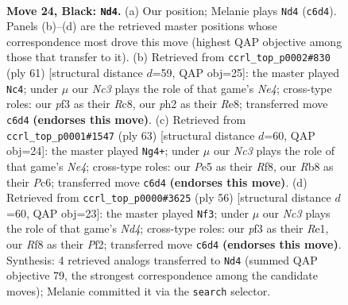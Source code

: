 \documentclass[11pt]{article}
\begin{document}
\clearpage

\begin{figure}[p]\centering
\begin{subfigure}{0.46\textwidth}\centering
\resizebox{\linewidth}{!}{%
\newchessgame
\chessboard[
  setfen={1rb2r2/p1pp1pk1/2n5/2R1p2p/8/5PP1/PP3P1P/2B1KB1R b - - 1 24},
  showmover=false,
  pgfstyle=straightmove, color=movearrow, markmove={c6-d4}
]}
\caption{}
\end{subfigure}\hfill
\begin{subfigure}{0.46\textwidth}\centering
\resizebox{\linewidth}{!}{%
\newchessgame
\chessboard[
  setfen={2r1r1k1/5pp1/p5p1/Pp1Rn1B1/1b5P/1N4P1/1P2PP2/1R4K1 b - - 0 31},
  showmover=false,
  pgfstyle=straightmove, color=movearrow, markmove={e5-c4}
]}
\caption{}
\end{subfigure}
\\[4pt]
\begin{subfigure}{0.46\textwidth}\centering
\resizebox{\linewidth}{!}{%
\newchessgame
\chessboard[
  setfen={5r2/1p2k3/2ppr3/p3np1p/2P2P1P/6P1/PP1RBK2/4R3 b - - 0 32},
  showmover=false,
  pgfstyle=straightmove, color=movearrow, markmove={e5-g4}
]}
\caption{}
\end{subfigure}\hfill
\begin{subfigure}{0.46\textwidth}\centering
\resizebox{\linewidth}{!}{%
\newchessgame
\chessboard[
  setfen={4r1k1/pp1b1n1p/4p1p1/3pb3/3N3P/1P1R4/P2B1PP1/4R1K1 w - - 1 29},
  showmover=false,
  pgfstyle=straightmove, color=movearrow, markmove={d4-f3}
]}
\caption{}
\end{subfigure}
\caption{\textbf{Move 24, Black: \texttt{Nd4}.} (a) Our position; Melanie plays \texttt{Nd4} (\texttt{c6d4}). Panels (b)--(d) are the retrieved master positions whose correspondence most drove this move (highest QAP objective among those that transfer to it). (b) Retrieved from \texttt{ccrl\_top\_p0002\#830} (ply 61) [structural distance $d$=59, QAP obj=25]: the master played \texttt{Nc4}; under $\mu$ our \emph{Nc3} plays the role of that game's \emph{Ne4}; cross-type roles: our \emph{p}f3 as their \emph{R}c8, our \emph{p}h2 as their \emph{R}e8; transferred move \texttt{c6d4} \textbf{(endorses this move)}. (c) Retrieved from \texttt{ccrl\_top\_p0001\#1547} (ply 63) [structural distance $d$=60, QAP obj=24]: the master played \texttt{Ng4+}; under $\mu$ our \emph{Nc3} plays the role of that game's \emph{Ne4}; cross-type roles: our \emph{P}e5 as their \emph{R}f8, our \emph{R}b8 as their \emph{P}c6; transferred move \texttt{c6d4} \textbf{(endorses this move)}. (d) Retrieved from \texttt{ccrl\_top\_p0000\#3625} (ply 56) [structural distance $d$=60, QAP obj=23]: the master played \texttt{Nf3}; under $\mu$ our \emph{Nc3} plays the role of that game's \emph{Nd4}; cross-type roles: our \emph{p}f3 as their \emph{R}e1, our \emph{R}f8 as their \emph{P}f2; transferred move \texttt{c6d4} \textbf{(endorses this move)}. Synthesis: 4 retrieved analogs transferred to \texttt{Nd4} (summed QAP objective 79, the strongest correspondence among the candidate moves); Melanie committed it via the \texttt{search} selector.}
\label{fig:thought-m47}
\end{figure}
\end{document}
